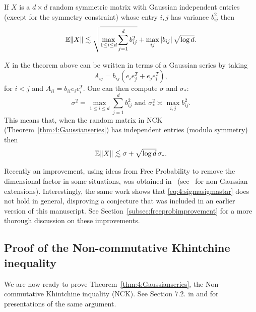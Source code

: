 \begin{theorem}\label{thm:4:matrixconcentrationindependententries}
 If $X$ is a $d\times d$ random symmetric matrix with Gaussian independent entries (except for the symmetry constraint) whose entry $i,j$ has variance $b_{ij}^2$ then
 \[
  \mathbb{E} \| X\| \lesssim \sqrt{ \max_{1\leq i\leq d} \sum_{j=1}^d b_{ij}^2 } + \max_{ij}\left| b_{ij} \right| \sqrt{\log d}.
 \]
\end{theorem}



\begin{remark}
 $X$ in the theorem above can be written in terms of a Gaussian series by taking
 \[
  A_{ij} = b_{ij} \left( e_ie_j^T + e_je_i^T  \right),
 \]
for $i< j$ and $A_{ii} = b_{ii}e_ie_i^T$. One can then compute $\sigma$ and $\sigma_\ast$:
\[
 \sigma^2 = \max_{1\leq i\leq d} \sum_{j=1}^d b_{ij}^2 \text{ and } \sigma_\ast^2 \asymp \max_{i,j}b_{ij}^2.
\]
This means that, when the random matrix in NCK (Theorem~\ref{thm:4:Gaussianseries}) has independent entries (modulo symmetry) then
\begin{equation}\label{eq:4:sigmasigmastar}
 \mathbb{E}\|X\| \lesssim \sigma + \sqrt{\log d}\,\sigma_\ast.
\end{equation}
\end{remark}

Recently an improvement, using ideas from Free Probability to remove the dimensional factor in some situations, was obtained in~
\cite{Bandeiraetal_FreeProbability} (see~\cite{Tatianaetal_Universality} for non-Gaussian extensions). Interestingly, the same work shows that \eqref{eq:4:sigmasigmastar} does not hold in general, disproving a conjecture that was included in an earlier version of this manuscript. See Section~\ref{subsec:freeprobimprovement} for a more thorough discussion on these improvements.




\subsection{Proof of the Non-commutative Khintchine inequality}\label{subsec:proofNCK}

We are now ready to prove Theorem~\ref{thm:4:Gaussianseries}, the Non-commutative Khintchine inquality (NCK). See Section 7.2. in \cite[Section 7.2]{Tropp:TailBoundsSecondOrder} and \cite{Ramon-StFlour-2022} for presentations of the same argument.



